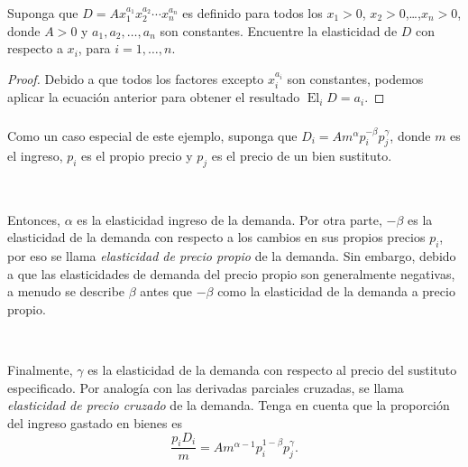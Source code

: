 \begin{frame}[t]
\frametitle{\subsecname}

\begin{example}
Suponga que $D=Ax^{a_{1}}_{1}x^{a_{2}}_{2}\cdots x^{a_{n}}_{n}$ es definido para todos los $x_{1}>0$, $x_{2}>0$,\ldots,$x_{n}>0$, donde $A>0$ y $a_{1},a_{2},\ldots,a_{n}$ son constantes. Encuentre la elasticidad de $D$ con respecto a $x_{i}$, para $i=1,\ldots,n$.
\end{example}

\begin{proof}
Debido a que todos los factores excepto $x^{a_{i}}_{i}$ son constantes, podemos aplicar la ecuación anterior para obtener el resultado $\operatorname{El}_{i}D=a_{i}$.
\end{proof}

\end{frame}

\begin{frame}[t]
\frametitle{\subsecname}
Como un caso especial de este ejemplo, suponga que $D_{i}=Am^{\alpha}p^{-\beta}_{i}p^{\gamma}_{j}$, donde $m$ es el ingreso, $p_{i}$ es el propio precio y  $p_{j}$ es el precio de un bien sustituto.

\

Entonces, $\alpha$ es la elasticidad ingreso de la demanda. Por otra parte, $-\beta$ es la elasticidad de la demanda con respecto a los cambios en sus propios precios $p_{i}$, por eso se llama \emph{elasticidad de precio propio} de la demanda. Sin embargo, debido a que las elasticidades de demanda del precio propio son generalmente negativas, a menudo se describe $\beta$ antes que $-\beta$ como la elasticidad de la demanda a precio propio.

\

Finalmente, $\gamma$ es la elasticidad de la demanda con respecto al precio del sustituto especificado. Por analogía con las derivadas parciales cruzadas, se llama \emph{elasticidad de precio cruzado} de la demanda. Tenga en cuenta que la proporción del ingreso gastado en bienes es \[ \frac{p_{i}D_{i}}{m}=Am^{\alpha-1}p^{1-\beta}_{i}p^{\gamma}_{j}. \]
\end{frame}

